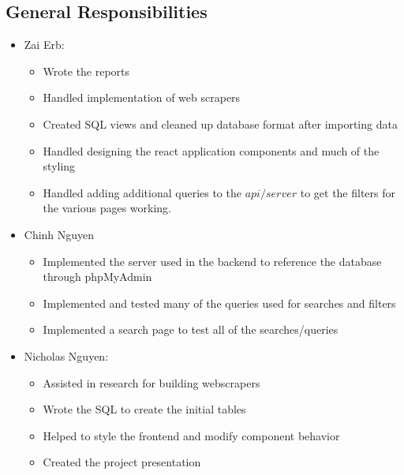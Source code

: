\documentclass{article}
\begin{document}
\subsection{General Responsibilities}
\begin{itemize}
    \item Zai Erb: 
    \begin{itemize}
        \item Wrote the reports
        \item Handled implementation of web scrapers
        \item Created SQL views and cleaned up database format after importing data 
        \item Handled designing the react application components and much of the styling
        \item Handled adding additional queries to the $api/server$  to get the filters for the various pages working.
    \end{itemize}

    \item Chinh Nguyen
    \begin{itemize}
        \item Implemented the server used in the backend to reference the database through phpMyAdmin
        \item Implemented and tested many of the queries used for searches and filters 
        \item Implemented a search page to test all of the searches/queries
    \end{itemize}

    \item Nicholas Nguyen:
    \begin{itemize}
        \item Assisted in research for building webscrapers
        \item Wrote the SQL to create the initial tables
        \item Helped to style the frontend and modify component behavior
        \item Created the project presentation
    \end{itemize}
\end{itemize}
\end{document}
